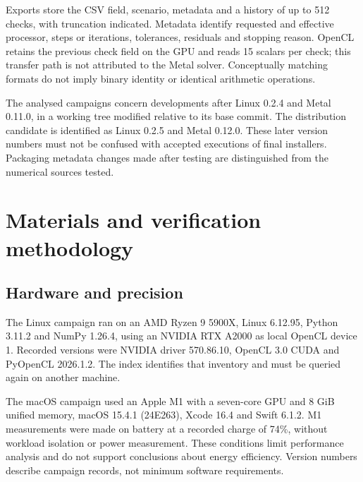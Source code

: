 \documentclass[11pt,a4paper]{article}
\begin{document}
Exports store the CSV field, scenario, metadata and a history of up to 512 checks, with truncation indicated. Metadata identify requested and effective processor, steps or iterations, tolerances, residuals and stopping reason. OpenCL retains the previous check field on the GPU and reads 15 scalars per check; this transfer path is not attributed to the Metal solver. Conceptually matching formats do not imply binary identity or identical arithmetic operations.

The analysed campaigns concern developments after Linux 0.2.4 and Metal 0.11.0, in a working tree modified relative to its base commit. The distribution candidate is identified as Linux 0.2.5 and Metal 0.12.0. These later version numbers must not be confused with accepted executions of final installers. Packaging metadata changes made after testing are distinguished from the numerical sources tested.

\section{Materials and verification methodology}
\subsection{Hardware and precision}
The Linux campaign ran on an AMD Ryzen 9 5900X, Linux 6.12.95, Python 3.11.2 and NumPy 1.26.4, using an NVIDIA RTX A2000 as local OpenCL device 1. Recorded versions were NVIDIA driver 570.86.10, OpenCL 3.0 CUDA and PyOpenCL 2026.1.2. The index identifies that inventory and must be queried again on another machine.

The macOS campaign used an Apple M1 with a seven-core GPU and 8 GiB unified memory, macOS 15.4.1 (24E263), Xcode 16.4 and Swift 6.1.2. M1 measurements were made on battery at a recorded charge of 74\%, without workload isolation or power measurement. These conditions limit performance analysis and do not support conclusions about energy efficiency. Version numbers describe campaign records, not minimum software requirements.
\end{document}
